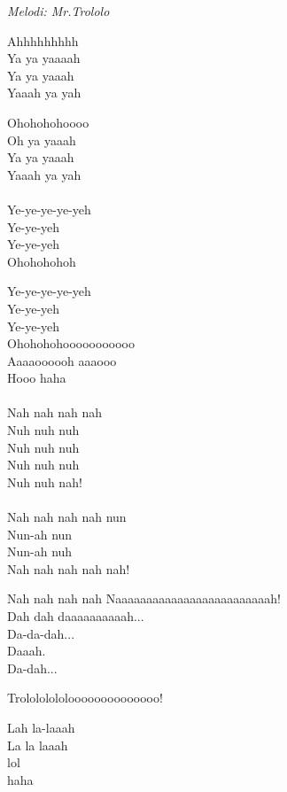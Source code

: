 {\footnotesize\textit{Melodi: Mr.Trololo}}\par
\vspace{10pt}
Ahhhhhhhhh\\
Ya ya yaaaah\\
Ya ya yaaah\\
Yaaah ya yah\par
\vspace{10pt}
Ohohohohoooo\\
Oh ya yaaah\\
Ya ya yaaah\\
Yaaah ya yah\\
\\
Ye-ye-ye-ye-yeh\\
Ye-ye-yeh\\
Ye-ye-yeh\\
Ohohohohoh\par
\vspace{10pt}
Ye-ye-ye-ye-yeh\\
Ye-ye-yeh\\
Ye-ye-yeh\\
Ohohohohooooooooooo\\
Aaaaoooooh aaaooo\\
Hooo haha\\
\\
Nah nah nah nah\\
Nuh nuh nuh\\
Nuh nuh nuh\\
Nuh nuh nuh\\
Nuh nuh nah!\\
\\
Nah nah nah nah nun\\
Nun-ah nun\\
Nun-ah nuh\\
Nah nah nah nah nah!\par
\vspace{10pt}
Nah nah nah nah Naaaaaaaaaaaaaaaaaaaaaaaaah!\\
Dah dah daaaaaaaaaah...\\
Da-da-dah...\\
Daaah.\\
Da-dah...\par
\vspace{10pt}
Trolololololoooooooooooooo!\par
\vspace{10pt}
Lah la-laaah\\
La la laaah\\
lol\\
haha\\
